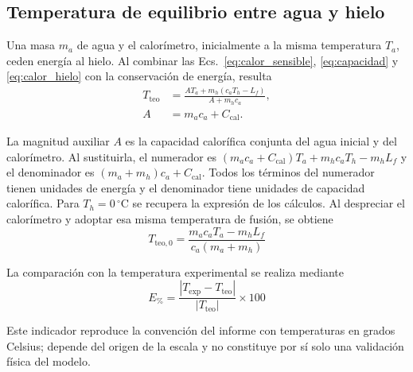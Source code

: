 \subsection{Temperatura de equilibrio entre agua y hielo}
Una masa $m_a$ de agua y el calorímetro, inicialmente a la misma temperatura $T_a$, ceden energía al hielo. Al combinar las Ecs.~\eqref{eq:calor_sensible}, \eqref{eq:capacidad} y \eqref{eq:calor_hielo} con la conservación de energía, resulta
\begin{equation}
  \begin{split}
    T_{\mathrm{teo}}&=\frac{A T_a+m_h(c_aT_h-L_f)}{A+m_hc_a},\\
    A&=m_ac_a+C_{\mathrm{cal}}.
  \end{split}
  \label{eq:temperatura_teorica}
\end{equation}

La magnitud auxiliar $A$ es la capacidad calorífica conjunta del agua inicial y del calorímetro. Al sustituirla, el numerador es $(m_ac_a+C_{\mathrm{cal}})T_a+m_hc_aT_h-m_hL_f$ y el denominador es $(m_a+m_h)c_a+C_{\mathrm{cal}}$. Todos los términos del numerador tienen unidades de energía y el denominador tiene unidades de capacidad calorífica. Para $T_h=0\,{}^{\circ}\mathrm{C}$ se recupera la expresión de los cálculos. Al despreciar el calorímetro y adoptar esa misma temperatura de fusión, se obtiene
\begin{equation}
    T_{\mathrm{teo},0}=
    \frac{m_ac_aT_a-m_hL_f}
    {c_a(m_a+m_h)}
    \label{eq:temperatura_sin_calorimetro}
\end{equation}

La comparación con la temperatura experimental se realiza mediante
\begin{equation}
    E_{\%}=
    \frac{|T_{\mathrm{exp}}-T_{\mathrm{teo}}|}
    {|T_{\mathrm{teo}}|}\times100
    \label{eq:error_porcentual}
\end{equation}

Este indicador reproduce la convención del informe con temperaturas en grados Celsius; depende del origen de la escala y no constituye por sí solo una validación física del modelo.


